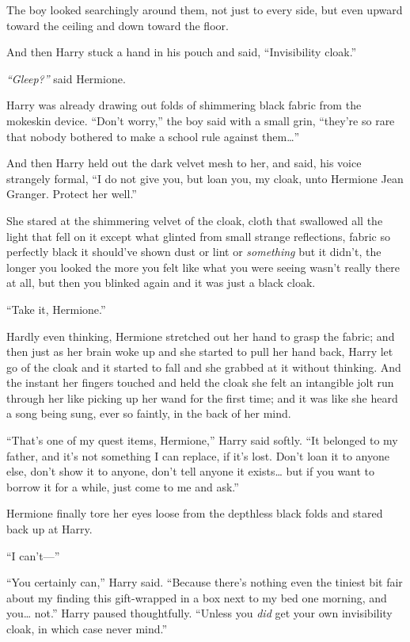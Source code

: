 The boy looked searchingly around them, not just to every side, but even
upward toward the ceiling and down toward the floor.

And then Harry stuck a hand in his pouch and said, ``Invisibility
cloak.''

\emph{``Gleep?''} said Hermione.

Harry was already drawing out folds of shimmering black fabric from the
mokeskin device. ``Don't worry,'' the boy said with a small grin,
``they're so rare that nobody bothered to make a school rule against
them\ldots{}''

And then Harry held out the dark velvet mesh to her, and said, his voice
strangely formal, ``I do not give you, but loan you, my cloak, unto
Hermione Jean Granger. Protect her well.''

She stared at the shimmering velvet of the cloak, cloth that swallowed
all the light that fell on it except what glinted from small strange
reflections, fabric so perfectly black it should've shown dust or lint
or \emph{something} but it didn't, the longer you looked the more you
felt like what you were seeing wasn't really there at all, but then you
blinked again and it was just a black cloak.

``Take it, Hermione.''

Hardly even thinking, Hermione stretched out her hand to grasp the
fabric; and then just as her brain woke up and she started to pull her
hand back, Harry let go of the cloak and it started to fall and she
grabbed at it without thinking. And the instant her fingers touched and
held the cloak she felt an intangible jolt run through her like picking
up her wand for the first time; and it was like she heard a song being
sung, ever so faintly, in the back of her mind.

``That's one of my quest items, Hermione,'' Harry said softly. ``It
belonged to my father, and it's not something I can replace, if it's
lost. Don't loan it to anyone else, don't show it to anyone, don't tell
anyone it exists\ldots{} but if you want to borrow it for a while, just
come to me and ask.''

Hermione finally tore her eyes loose from the depthless black folds and
stared back up at Harry.

``I can't---''

``You certainly can,'' Harry said. ``Because there's nothing even the
tiniest bit fair about my finding this gift-wrapped in a box next to my
bed one morning, and you\ldots{} not.'' Harry paused thoughtfully.
``Unless you \emph{did} get your own invisibility cloak, in which case
never mind.''

